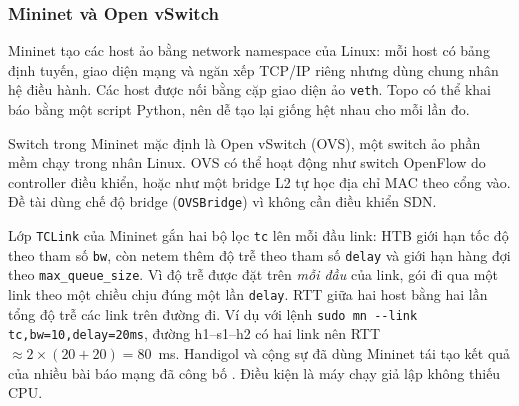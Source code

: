 \subsubsection{Mininet và Open vSwitch}
Mininet \cite{lantz2010mininet} tạo các host ảo bằng network namespace của Linux: mỗi host có bảng định tuyến, giao diện mạng và ngăn xếp TCP/IP riêng nhưng dùng chung nhân hệ điều hành. Các host được nối bằng cặp giao diện ảo \texttt{veth}. Topo có thể khai báo bằng một script Python, nên dễ tạo lại giống hệt nhau cho mỗi lần đo.

Switch trong Mininet mặc định là Open vSwitch (OVS), một switch ảo phần mềm chạy trong nhân Linux. OVS có thể hoạt động như switch OpenFlow do controller điều khiển, hoặc như một bridge L2 tự học địa chỉ MAC theo cổng vào. Đề tài dùng chế độ bridge (\texttt{OVSBridge}) vì không cần điều khiển SDN.

Lớp \texttt{TCLink} của Mininet gắn hai bộ lọc \texttt{tc} lên mỗi đầu link: HTB giới hạn tốc độ theo tham số \texttt{bw}, còn netem thêm độ trễ theo tham số \texttt{delay} và giới hạn hàng đợi theo \nolinkurl{max_queue_size}. Vì độ trễ được đặt trên \emph{mỗi đầu} của link, gói đi qua một link theo một chiều chịu đúng một lần \texttt{delay}. RTT giữa hai host bằng hai lần tổng độ trễ các link trên đường đi. Ví dụ với lệnh \texttt{sudo mn -{}-link tc,bw=10,delay=20ms}, đường h1--s1--h2 có hai link nên RTT $\approx 2 \times (20 + 20) = 80$~ms. Handigol và cộng sự đã dùng Mininet tái tạo kết quả của nhiều bài báo mạng đã công bố \cite{handigol2012reproducible}. Điều kiện là máy chạy giả lập không thiếu CPU.

